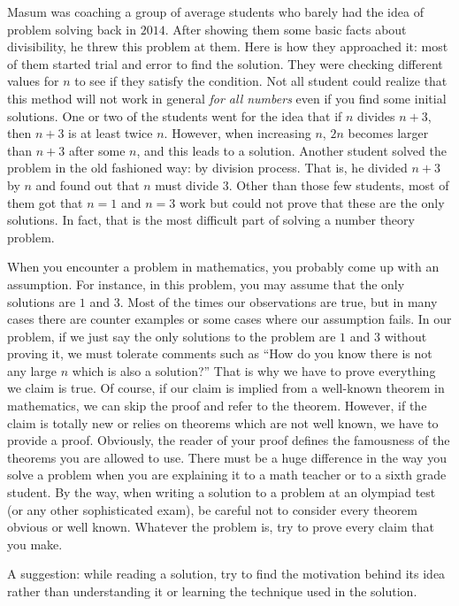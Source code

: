\documentclass{subfile}
\begin{document}
	Masum was coaching a group of average students who barely had the idea of problem solving back in $2014$. After showing them some basic facts about divisibility, he threw this problem at them. Here is how they approached it: most of them started trial and error to find the solution. They were checking different values for $n$ to see if they satisfy the condition. Not all student could realize that this method will not work in general \textit{for all numbers} even if you find some initial solutions. One or two of the students went for the idea that if $n$ divides $n+3$, then $n+3$ is at least twice $n$. However, when increasing $n$, $2n$ becomes larger than $n+3$ after some $n$, and this leads to a solution. Another student solved the problem in the old fashioned way: by division process. That is, he divided $n+3$ by $n$ and found out that $n$ must divide $3$. Other than those few students, most of them got that $n=1$ and $n=3$ work but could not prove that these are the only solutions. In fact, that is the most difficult part of solving a number theory problem.

	When you encounter a problem in mathematics, you probably come up with an assumption. For instance, in this problem, you may assume that the only solutions are $1$ and $3$. Most of the times our observations are true, but in many cases there are counter examples or some cases where our assumption fails. In our problem, if we just say the only solutions to the problem are $1$ and $3$ without proving it, we must tolerate comments such as ``How do you know there is not any large $n$ which is also a solution?'' That is why we have to prove everything we claim is true. Of course, if our claim is implied from a well-known theorem in mathematics, we can skip the proof and refer to the theorem. However, if the claim is totally new or relies on theorems which are not well known, we have to provide a proof. Obviously, the reader of your proof defines the famousness of the theorems you are allowed to use. There must be a huge difference in the way you solve a problem when you are explaining it to a math teacher or to a sixth grade student. By the way, when writing a solution to a problem at an olympiad test (or any other sophisticated exam), be careful not to consider every theorem obvious or well known. Whatever the problem is, try to prove every claim that you make.

	A suggestion: while reading a solution, try to find the motivation behind its idea rather than understanding it or learning the technique used in the solution.
\end{document}
